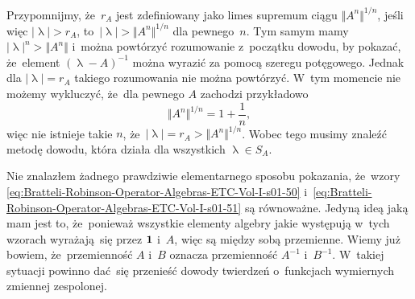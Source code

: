 \documentclass[a4paper,11pt]{article}
\renewcommand{\lambda}{\uplambda}
\begin{document}
Przypomnijmy, że~$r_{ A }$ jest zdefiniowany jako limes supremum ciągu
$\Vert A^{ n }\Vert^{ 1 / n }$, jeśli więc $| \lambda | > r_{ A }$,
to~$| \lambda | > \Vert A^{ n } \Vert^{ 1 / n }$ dla pewnego~$n$. Tym samym mamy
$| \lambda |^{ n } > \Vert A^{ n } \Vert$ i~można powtórzyć rozumowanie z~początku dowodu,
by pokazać, że~element $( \lambda - A )^{ -1 }$ można wyrazić za pomocą szeregu
potęgowego. Jednak dla $| \lambda | = r_{ A }$ takiego rozumowania nie można
powtórzyć. W~tym momencie nie możemy wykluczyć, że~dla pewnego $A$ zachodzi
przykładowo
\begin{equation}
  \label{eq:Bratteli-Robinson-Operator-Algebras-ETC-Vol-I-s01-52}
  \Vert A^{ n } \Vert^{ 1 / n } = 1 + \frac{ 1 }{ n },
\end{equation}
więc nie istnieje takie $n$, że~$| \lambda | = r_{ A } > \Vert A^{ n } \Vert^{ 1 / n }$.
Wobec tego musimy znaleźć metodę dowodu, która działa dla wszystkich
$\lambda \in S_{ A }$.

Nie znalazłem żadnego prawdziwie elementarnego sposobu pokazania,
że~wzory \eqref{eq:Bratteli-Robinson-Operator-Algebras-ETC-Vol-I-s01-50}
i~\eqref{eq:Bratteli-Robinson-Operator-Algebras-ETC-Vol-I-s01-51} są
równoważne. Jedyną ideą jaką mam jest to, że~ponieważ wszystkie elementy
algebry jakie występują w~tych wzorach wyrażają~się przez $\mathbf{1}$ i~$A$,
więc są między sobą przemienne. Wiemy już bowiem, że~przemienność $A$ i~$B$
oznacza przemienność $A^{ -1 }$ i~$B^{ -1 }$. W~takiej sytuacji powinno
dać~się przenieść dowody twierdzeń o~funkcjach wymiernych zmiennej
zespolonej.
\end{document}
